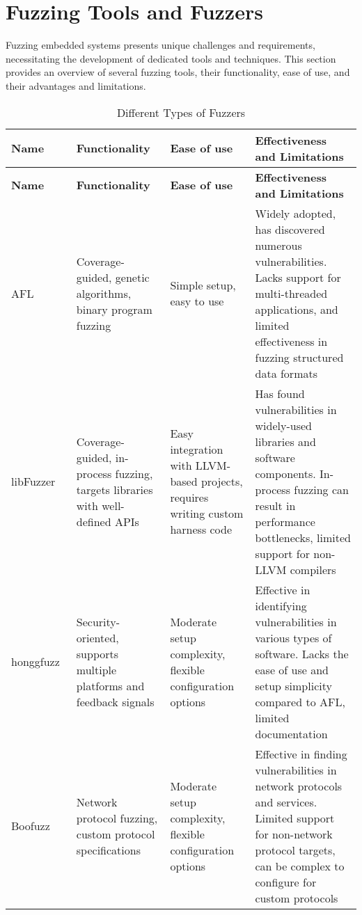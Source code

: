 \section{Fuzzing Tools and Fuzzers}

Fuzzing embedded systems presents unique challenges and requirements, necessitating the development
of dedicated tools and techniques. This section provides an overview of several fuzzing tools,
their functionality, ease of use, and their advantages and limitations.

\begin{longtable}{p{2.5cm}p{3cm}p{3cm}p{5cm}}
\caption{Different Types of Fuzzers}
\label{tab:fuzzers_table} \\
\toprule
\textbf{Name} & \textbf{Functionality} & \textbf{Ease of use} & \textbf{Effectiveness and Limitations} \\
\midrule
\endfirsthead
\toprule
\textbf{Name} & \textbf{Functionality} & \textbf{Ease of use} & \textbf{Effectiveness and Limitations} \\
\midrule
\endhead
AFL~\cite{zalewski2014american}~\cite{GitHubgo92:online} & Coverage-guided, genetic algorithms, binary program fuzzing & Simple setup, easy to use & Widely adopted, has discovered numerous vulnerabilities. Lacks support for multi-threaded applications, and limited effectiveness in fuzzing structured data formats \\
\midrule
libFuzzer~\cite{libFuzze17:online} & Coverage-guided, in-process fuzzing, targets libraries with well-defined APIs & Easy integration with LLVM-based projects, requires writing custom harness code & Has found vulnerabilities in widely-used libraries and software components. In-process fuzzing can result in performance bottlenecks, limited support for non-LLVM compilers \\
\midrule
honggfuzz~\cite{GitHubgo89:online} & Security-oriented, supports multiple platforms and feedback signals & Moderate setup complexity, flexible configuration options & Effective in identifying vulnerabilities in various types of software. Lacks the ease of use and setup simplicity compared to AFL, limited documentation \\
\midrule
Boofuzz\cite{pereyda2019boofuzz} & Network protocol fuzzing, custom protocol specifications & Moderate setup complexity, flexible configuration options & Effective in finding vulnerabilities in network protocols and services. Limited support for non-network protocol targets, can be complex to configure for custom protocols \\

\end{longtable}
